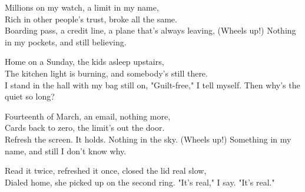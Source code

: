 \begin{lyrics}
Millions on my watch, a limit in my name,\\
Rich in other people's trust, broke all the same.\\
Boarding pass, a credit line, a plane that's always leaving,
(Wheels up!) Nothing in my pockets, and still believing.

Home on a Sunday, the kids asleep upstairs,\\
The kitchen light is burning, and somebody's still there.\\
I stand in the hall with my bag still on,
"Guilt-free," I tell myself. Then why's the quiet so long?

Fourteenth of March, an email, nothing more,\\
Cards back to zero, the limit's out the door.\\
Refresh the screen. It holds. Nothing in the sky.
(Wheels up!) Something in my name, and still I don't know why.

Read it twice, refreshed it once, closed the lid real slow,\\
Dialed home, she picked up on the second ring.
 "It's real," I say. "It's real."
\end{lyrics}

